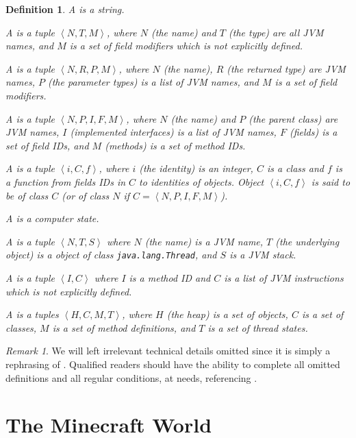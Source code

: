 \documentclass{book}
\newtheorem{definition}{Definition}
\theoremstyle{definition}\newtheorem{mechanism}{Mechanism}
\theoremstyle{remark}\newtheorem*{remark}{Remark}
\begin{document}
\begin{definition}
	A  is a string.
	
	A  is a tuple $\left<N, T, M\right>$, where $N$ (the name) and $T$ (the type) are all JVM names, and $M$ is a set of field modifiers  which is not explicitly defined.
	
	A  is a tuple $\left<N, R, P, M\right>$, where $N$ (the name), $R$ (the returned type) are JVM names, $P$ (the parameter types) is a list of JVM names, and $M$ is a set of field modifiers.
	
	A  is a tuple $\left<N, P, I, F, M\right>$, where $N$ (the name) and $P$ (the parent class) are JVM names, $I$ (implemented interfaces) is a list of JVM names, $F$ (fields) is a set of field IDs, and $M$ (methods) is a set of method IDs.

	A  is a tuple $\left<i, C, f\right>$, where $i$ (the identity) is an integer, $C$ is a class and $f$ is a function from fields IDs in $C$ to identities of objects. Object $\left<i, C, f\right>$ is said to be of class $C$ (or of class $N$ if $C = \left<N, P, I, F, M\right>$).
	
	A  is a computer state.
	
	A  is a tuple $\left<N, T, S\right>$ where $N$ (the name) is a JVM name, $T$ (the underlying object) is a object of class \texttt{java.lang.Thread}, and $S$ is a JVM stack.
	
	A  is a tuple $\left<I, C\right>$ where $I$ is a method ID and $C$ is a list of JVM instructions which is not explicitly defined.
	
	A  is a tuples $\left<H, C, M, T\right>$, where $H$ (the heap) is a set of objects, $C$ is a set of classes, $M$ is a set of method definitions, and $T$ is a set of thread states.
\end{definition}

\begin{remark}
	We will left irrelevant technical details omitted since it is simply a rephrasing of \cite{JVMS}. Qualified readers should have the ability to complete all omitted definitions and all regular conditions, at needs, referencing \cite{JVMS}. 
\end{remark}


\section{The Minecraft World}
\end{document}
